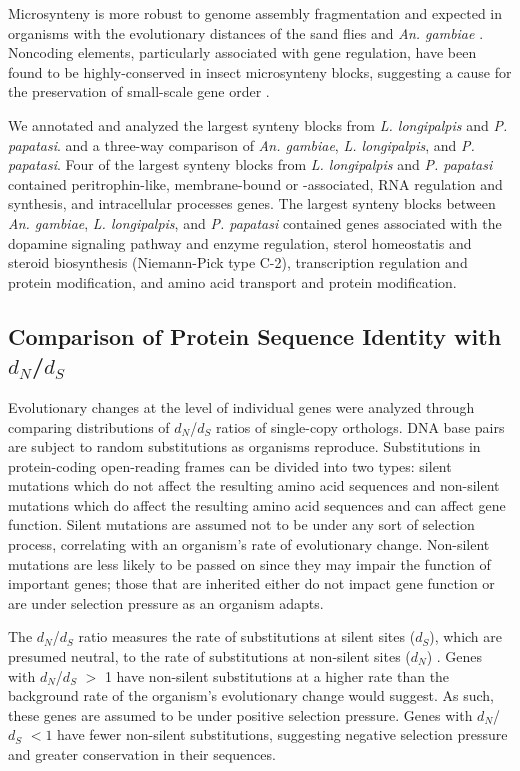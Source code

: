 Microsynteny is more robust to genome assembly fragmentation and expected in organisms with the evolutionary distances of the sand flies and \emph{An. gambiae} \cite{Zdobnov2002}. Noncoding elements, particularly associated with gene regulation, have been found to be highly-conserved in insect microsynteny blocks, suggesting a cause for the preservation of small-scale gene order \cite{Engstrom2007}.

We annotated and analyzed the largest synteny blocks from \emph{L. longipalpis} and \emph{P. papatasi}. and a three-way comparison of \emph{An. gambiae}, \emph{L. longipalpis}, and \emph{P. papatasi}.  Four of the largest synteny blocks from \emph{L. longipalpis} and \emph{P. papatasi} contained peritrophin-like, membrane-bound or -associated, RNA regulation and synthesis, and intracellular processes genes. The largest synteny blocks between \emph{An. gambiae}, \emph{L. longipalpis}, and \emph{P. papatasi} contained genes associated with the dopamine signaling pathway and enzyme regulation, sterol homeostatis and steroid biosynthesis (Niemann-Pick type C-2), transcription regulation and protein modification, and amino acid transport and protein modification.

\subsection{Comparison of Protein Sequence Identity with $d_N$/$d_S$}
Evolutionary changes at the level of individual genes were analyzed through comparing distributions of $d_N$/$d_S$ ratios of single-copy orthologs. DNA base pairs are subject to random substitutions as organisms reproduce.  Substitutions in protein-coding open-reading frames can be divided into two types: silent mutations which do not affect the resulting amino acid sequences and non-silent mutations which do affect the resulting amino acid sequences and can affect gene function.  Silent mutations are assumed not to be under any sort of selection process, correlating with an organism's rate of evolutionary change.  Non-silent mutations are less likely to be passed on since they may impair the function of important genes; those that are inherited either do not impact gene function or are under selection pressure as an organism adapts.

The $d_N$/$d_S$ ratio measures the rate of substitutions at silent sites ($d_S$), which are presumed neutral, to the rate of substitutions at non-silent sites ($d_N$) \cite{Kryazhimskiy2008}. Genes with $d_N$/$d_S$ $>$ 1 have non-silent substitutions at a higher rate than the background rate of the organism's evolutionary change would suggest.  As such, these genes are assumed to be under positive selection pressure.  Genes with $d_N$/$d_S$ $<1$ have fewer non-silent substitutions, suggesting negative selection pressure and greater conservation in their sequences.

